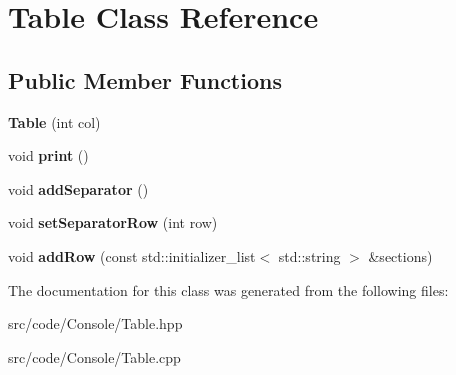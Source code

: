 \hypertarget{class_table}{}\section{Table Class Reference}
\label{class_table}
\subsection*{Public Member Functions}
\begin{DoxyCompactItemize}
\item 
\mbox{\label{class_table_a70bdd83ee8bd2f7579137227554827a0}} 
{\bfseries Table} (int col)
\item 
\mbox{\label{class_table_a0de5a9ca880b662ec7d608de686e309a}} 
void {\bfseries print} ()
\item 
\mbox{\label{class_table_a873ab12c54c5bdd98343a8a134c4ab01}} 
void {\bfseries add\+Separator} ()
\item 
\mbox{\label{class_table_a68c1f35216327e95b126e548e9bc5804}} 
void {\bfseries set\+Separator\+Row} (int row)
\item 
\mbox{\label{class_table_aedf028e43bb7c0cf188ee01627b24b00}} 
void {\bfseries add\+Row} (const std\+::initializer\+\_\+list$<$ std\+::string $>$ \&sections)
\end{DoxyCompactItemize}


The documentation for this class was generated from the following files\+:\begin{DoxyCompactItemize}
\item 
src/code/\+Console/Table.\+hpp\item 
src/code/\+Console/Table.\+cpp\end{DoxyCompactItemize}
